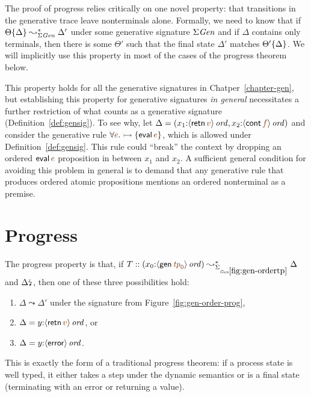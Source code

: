 The proof of progress relies critically on one novel property: that
transitions in the generative trace leave nonterminals
alone. Formally, we need to know that if ${\Theta}\{{\Delta}\}
\leadsto^*_{\Sigma{\it Gen}} \Delta'$ under some generative signature
$\Sigma{\it Gen}$ and if $\Delta$ contains only terminals, then there
is some $\Theta'$ such that the final state $\Delta'$ matches
${\Theta'}\{{\Delta}\}$. We will implicitly use this property in
most of the cases of the progress theorem below.

This property holds for all the generative signatures in
Chatper~\ref{chapter-gen}, but establishing this property for
generative signatures {\it in general} necessitates a further
restriction of what counts as a generative signature
(Definition~\ref{def:gensig}). To see why, let $\Delta =
(x_1{:}\istrue{\susp{{\sf retn}\,\lf{v}}}, x_2{:}\istrue{\susp{{\sf
      cont}\,\lf{f}}})$ and consider the generative rule $\forall
\lf{e}. \lefti \{ {\sf eval}\,\lf{e} \}$, which is allowed under
Definition~\ref{def:gensig}. This rule could ``break'' the context by
dropping an ordered ${\sf eval}\,\lf{e}$ proposition in between $x_1$
and $x_2$. A sufficient general condition for avoiding this problem in
general is to demand that any generative rule that produces ordered
atomic propositions mentions an ordered nonterminal as a premise.

\section{Progress}

The progress property is that, if $T ::
(x_0{:}\istrue{\susp{{\sf gen}\,\lf{{\it tp}_0}}})
\leadsto^*_{\siggenordertp} \Delta$ and ${\Delta}{\mbox{\lightning}}_{}$, then
one of these three possibilities hold:

\smallskip
\begin{enumerate}
\item ${\Delta}{} \leadsto \Delta'$ under
the signature from Figure~\ref{fig:gen-order-prog}, 
\item $\Delta = y{:}\istrue{\susp{{\sf retn}\,\lf{v}}}$, or
\item $\Delta = y{:}{\langle {{\sf error}} \rangle}\,{{\it ord}}$.
\end{enumerate}
\smallskip

\noindent
This is exactly the form of a traditional progress theorem: if a
process state is well typed, it either takes a step under the dynamic
semantics or is a final state (terminating with an error or returning
a value).

